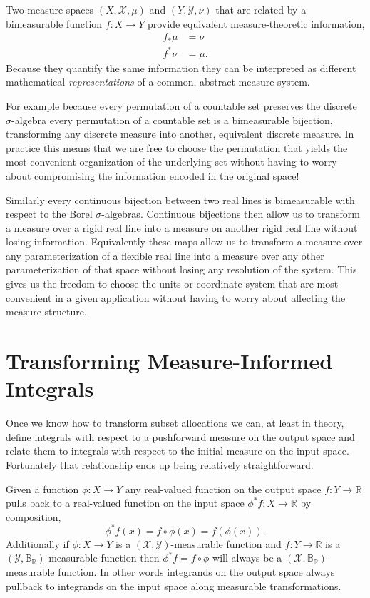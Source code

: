 \documentclass[
  letterpaper,
  DIV=11,
  numbers=noendperiod]{scrartcl}
\begin{document}
Two measure spaces \((X, \mathcal{X}, \mu)\) and
\((Y, \mathcal{Y}, \nu)\) that are related by a bimeasurable function
\(f : X \rightarrow Y\) provide equivalent measure-theoretic
information, \begin{align*}
f_{*} \mu &= \nu
\\
f^{*} \nu &= \mu.
\end{align*} Because they quantify the same information they can be
interpreted as different mathematical \emph{representations} of a
common, abstract measure system.

For example because every permutation of a countable set preserves the
discrete \(\sigma\)-algebra every permutation of a countable set is a
bimeasurable bijection, transforming any discrete measure into another,
equivalent discrete measure. In practice this means that we are free to
choose the permutation that yields the most convenient organization of
the underlying set without having to worry about compromising the
information encoded in the original space!

Similarly every continuous bijection between two real lines is
bimeasurable with respect to the Borel \(\sigma\)-algebras. Continuous
bijections then allow us to transform a measure over a rigid real line
into a measure on another rigid real line without losing information.
Equivalently these maps allow us to transform a measure over any
parameterization of a flexible real line into a measure over any other
parameterization of that space without losing any resolution of the
system. This gives us the freedom to choose the units or coordinate
system that are most convenient in a given application without having to
worry about affecting the measure structure.

\hypertarget{sec:transforming-integrals}{%
\section{Transforming Measure-Informed
Integrals}\label{sec:transforming-integrals}}

Once we know how to transform subset allocations we can, at least in
theory, define integrals with respect to a pushforward measure on the
output space and relate them to integrals with respect to the initial
measure on the input space. Fortunately that relationship ends up being
relatively straightforward.

Given a function \(\phi : X \rightarrow Y\) any real-valued function on
the output space \(f : Y \rightarrow \mathbb{R}\) pulls back to a
real-valued function on the input space
\(\phi^{*} f : X \rightarrow \mathbb{R}\) by composition, \[
\phi^{*} f(x) = f \circ \phi (x) = f(\phi(x)).
\] Additionally if \(\phi : X \rightarrow Y\) is a
\((\mathcal{X}, \mathcal{Y})\)-measurable function and
\(f : Y \rightarrow \mathbb{R}\) is a
\((\mathcal{Y}, \mathbb{B}_{\mathbb{R}})\)-measurable function then
\(\phi^{*} f = f \circ \phi\) will always be a
\((\mathcal{X}, \mathbb{B}_{\mathbb{R}})\)-measurable function. In other
words integrands on the output space always pullback to integrands on
the input space along measurable transformations.
\end{document}
